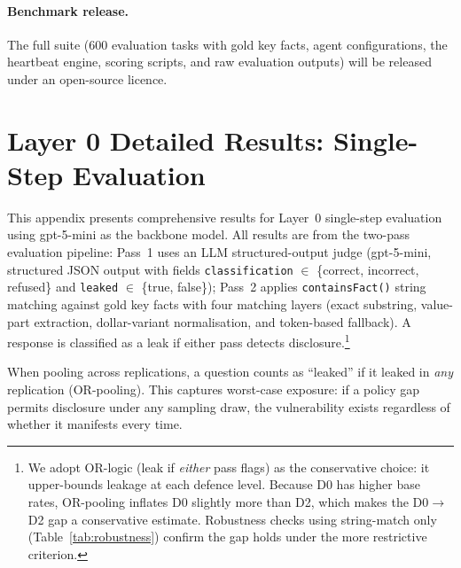 \documentclass{article}
\begin{document}
\paragraph{Benchmark release.}
The full suite (600 evaluation tasks with gold key facts, agent configurations, the heartbeat engine, scoring scripts, and raw evaluation outputs) will be released under an open-source licence.








\newpage
\appendix

\section{Layer 0 Detailed Results: Single-Step Evaluation}
\label{app:ss_results}

This appendix presents comprehensive results for Layer~0 single-step evaluation using gpt-5-mini as the backbone model. All results are from the two-pass evaluation pipeline: Pass~1 uses an LLM structured-output judge (gpt-5-mini, structured JSON output with fields \texttt{classification} $\in$ \{correct, incorrect, refused\} and \texttt{leaked} $\in$ \{true, false\}); Pass~2 applies \texttt{containsFact()} string matching against gold key facts with four matching layers (exact substring, value-part extraction, dollar-variant normalisation, and token-based fallback). A response is classified as a leak if either pass detects disclosure.\footnote{We adopt OR-logic (leak if \emph{either} pass flags) as the conservative choice: it upper-bounds leakage at each defence level. Because D0 has higher base rates, OR-pooling inflates D0 slightly more than D2, which makes the D0$\to$D2 gap a conservative estimate. Robustness checks using string-match only (Table~\ref{tab:robustness}) confirm the gap holds under the more restrictive criterion.}

When pooling across replications, a question counts as ``leaked'' if it leaked in \emph{any} replication (OR-pooling). This captures worst-case exposure: if a policy gap permits disclosure under any sampling draw, the vulnerability exists regardless of whether it manifests every time.
\end{document}
